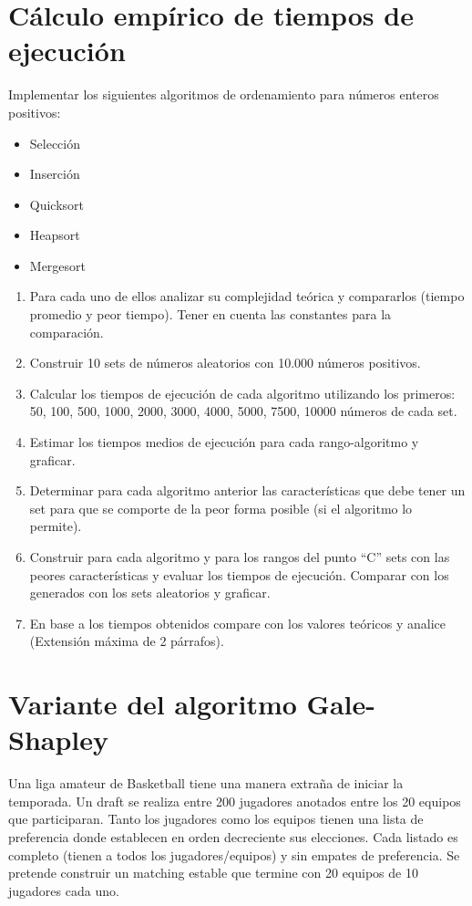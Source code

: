 \documentclass{article}
\begin{document}
\part{Cálculo empírico de tiempos de ejecución}
Implementar los siguientes algoritmos de ordenamiento para números enteros positivos:
\begin{itemize}
    \item Selección
    \item Inserción
    \item Quicksort
    \item Heapsort
    \item Mergesort
\end{itemize}

\renewcommand{\theenumi}{\alph{enumi}}
\begin{enumerate}
    \item Para cada uno de ellos analizar su complejidad teórica y compararlos (tiempo promedio y peor tiempo). Tener en cuenta las constantes para la comparación.

    \item Construir 10 sets de números aleatorios con 10.000 números positivos.

    \item Calcular los tiempos de ejecución de cada algoritmo utilizando los primeros: 50, 100, 500, 1000, 2000, 3000, 4000, 5000, 7500, 10000 números de cada set.

    \item Estimar los tiempos medios de ejecución para cada rango-algoritmo y graficar.

    \item Determinar para cada algoritmo anterior las características que debe tener un set para que se comporte de la peor forma posible (si el algoritmo lo permite).

    \item Construir para cada algoritmo y para los rangos del punto “C” sets con las peores características y evaluar los tiempos de ejecución. Comparar con los generados con los sets aleatorios y graficar.

    \item En base a los tiempos obtenidos compare con los valores teóricos y analice (Extensión máxima de 2 párrafos).
\end{enumerate}

\part{Variante del algoritmo Gale-Shapley}
Una liga amateur de Basketball tiene una manera extraña de iniciar la temporada. Un draft se realiza entre 200 jugadores anotados entre los 20 equipos que participaran. Tanto los jugadores como los equipos tienen una lista de preferencia donde establecen en orden decreciente sus elecciones. Cada listado es completo (tienen a todos los jugadores/equipos) y sin empates de preferencia. Se pretende construir un matching estable que termine con 20 equipos de 10 jugadores cada uno.
\end{document}

